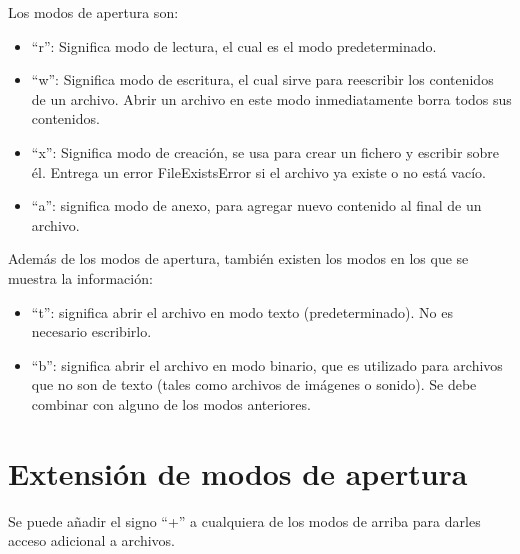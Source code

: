 \documentclass{report}
\newcommand{\doble}[1]{``#1''}
\begin{document}
Los modos de apertura son:

\begin{itemize}
  \item \doble{r}: Significa modo de lectura, el cual es el modo predeterminado.
  

  \item \doble{w}: Significa modo de escritura, el cual sirve para reescribir los contenidos de un archivo. Abrir un archivo en este modo inmediatamente borra todos sus contenidos.
  

  \item \doble{x}: Significa modo de creación, se usa para crear un fichero y escribir sobre él. Entrega un error FileExistsError si el archivo ya existe o no está vacío.
  

  \item \doble{a}: significa modo de anexo, para agregar nuevo contenido al final de un archivo.


\end{itemize}

Además de los modos de apertura, también existen los modos en los que se muestra la información:

\begin{itemize}
  \item \doble{t}: significa abrir el archivo en modo texto (predeterminado). No es necesario escribirlo.
  \item \doble{b}: significa abrir el archivo en modo binario, que es utilizado para archivos que no son de texto (tales como archivos de imágenes o sonido). Se debe combinar con alguno de los modos anteriores.


\end{itemize}

\section{Extensión de modos de apertura}

Se puede añadir el signo \doble{+} a cualquiera de los modos de arriba para darles acceso adicional a archivos.
\end{document}
